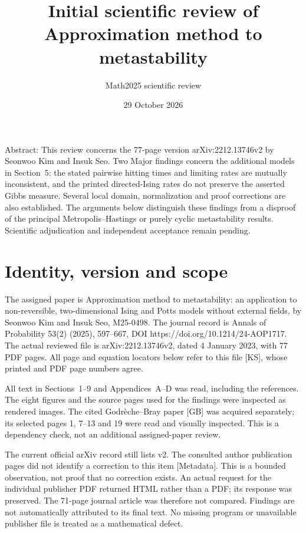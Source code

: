 \documentclass[10pt]{article}
\title{Initial scientific review of
Approximation method to metastability}
\author{Math2025 scientific review}
\date{29 October 2026}
\begin{document}
\maketitle
Abstract: This review concerns the 77-page version arXiv:2212.13746v2 by Seonwoo Kim and Insuk Seo. Two Major findings concern the additional models in Section 5: the stated pairwise hitting times and limiting rates are mutually inconsistent, and the printed directed-Ising rates do not preserve the asserted Gibbs measure. Several local domain, normalization and proof corrections are also established. The arguments below distinguish these findings from a disproof of the principal Metropolis–Hastings or purely cyclic metastability results. Scientific adjudication and independent acceptance remain pending.\par
\section*{Identity, version and scope}
The assigned paper is Approximation method to metastability: an application to non-reversible, two-dimensional Ising and Potts models without external fields, by Seonwoo Kim and Insuk Seo, M25-0498. The journal record is Annals of Probability 53(2) (2025), 597–667, DOI https://doi.org/10.1214/24-AOP1717. The actual reviewed file is arXiv:2212.13746v2, dated 4 January 2023, with 77 PDF pages. All page and equation locators below refer to this file [KS], whose printed and PDF page numbers agree.\par
All text in Sections 1–9 and Appendices A–D was read, including the references. The eight figures and the source pages used for the findings were inspected as rendered images. The cited Godrèche–Bray paper [GB] was acquired separately; its selected pages 1, 7–13 and 19 were read and visually inspected. This is a dependency check, not an additional assigned-paper review.\par
The current official arXiv record still lists v2. The consulted author publication pages did not identify a correction to this item [Metadata]. This is a bounded observation, not proof that no correction exists. An actual request for the individual publisher PDF returned HTML rather than a PDF; its response was preserved. The 71-page journal article was therefore not compared. Findings are not automatically attributed to its final text. No missing program or unavailable publisher file is treated as a mathematical defect.\par
\end{document}
